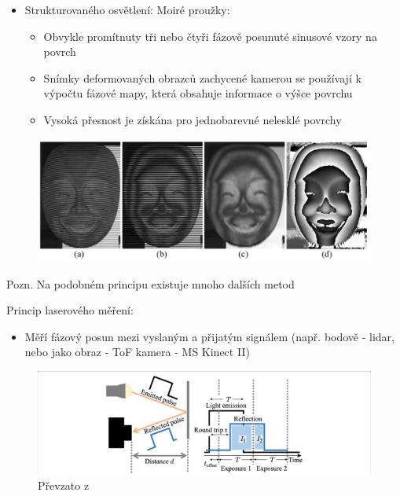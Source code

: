 \begin{frame}

\begin{itemize}
\item Strukturovaného osvětlení: Moiré  proužky:
    \begin{itemize}
    \item Obvykle promítnuty tři nebo čtyři fázově posunuté sinusové vzory na povrch 
    \item Snímky deformovaných obrazců zachycené kamerou se používají k výpočtu fázové mapy, která obsahuje informace o výšce povrchu
    \item Vysoká přesnost je získána pro jednobarevné nelesklé povrchy
    \end{itemize}
\end{itemize}
	\begin{figure}[!ht]
	\centering
	\includegraphics[width = 1.0\textwidth]{./moire}
	\end{figure}
Pozn. Na podobném principu existuje mnoho dalších metod 
\end{frame}

\begin{frame}
Princip laserového měření:
\begin{itemize}
\item Měří fázový posun mezi vyslaným a přijatým signálem (např. bodově - lidar, nebo jako obraz - ToF kamera - MS Kinect II)
\end{itemize}
	\begin{figure}[!ht]
	\centering
	\includegraphics[trim=30 0 30 0,clip, width = 1.0\textwidth]{./tof}
	\caption{Převzato z \cite{Kitano2017}}
	\end{figure}
\end{frame}


